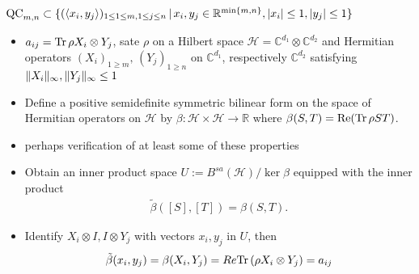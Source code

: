 \begin{frame}
\begin{exampleblock}{$ \textup{QC}_{m,n} \subset \{ (\langle x_i,y_j \rangle)_{1 \le 1 \le m, 1 \le j \le n} \,| \, x_i,y_j \in \mathbb{R}^{ \min \{m,n \} }, \vert x_i  \vert \le 1, \vert y_j \vert \le 1  \} $}
	\pause
	\begin{itemize}
		\item $ a_{ij} = \text{Tr} \, {\rho X_i \otimes Y_j}  $, sate $ \rho $ on a Hilbert space $ \mathcal{H} = \mathbb{C}^{d_1} \otimes\mathbb{C}^{d_2} $ and Hermitian operators $ (X_i)_{1 \ge m}, \, (Y_j)_{1 \ge n} $ on $ \mathbb{C}^{d_1} $, respectively $ \mathbb{C}^{d_2} $ satisfying $  \Vert {X_i} \Vert_{\infty},  \Vert {Y_j} \Vert_{\infty} \le 1 $
		\item Define a positive semidefinite symmetric bilinear form on the space of Hermitian operators on $ \mathcal{H} $ by 
		$ \beta: \mathcal{H} \times \mathcal{H} \to \mathbb{R} $ where $ \beta(S,T) =\textup{Re}( \text{Tr} \, {\rho ST} ) $.
		\item perhaps verification of at least some of these properties 
		\item Obtain an inner product space $ U := B^{sa}(\mathcal{H}) / \ker \beta$ equipped with the inner product 
		\begin{align*}
			\tilde{\beta}([S],[T]) = \beta(S,T).
		\end{align*}
		\item Identify $ X_i \otimes I,I \otimes Y_j $ with vectors $ x_i,y_j $ in $ U $, then 
		\begin{align*}
			\tilde{\beta}(x_i,y_j) = \beta(X_i,Y_j) = Re \text{Tr} \, {(\rho X_i \otimes Y_j)}  = a_{ij}
		\end{align*}
	\end{itemize}
\end{exampleblock}
\end{frame}
